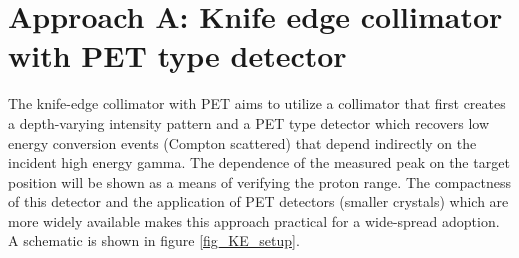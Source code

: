 \documentclass[11pt,a4paper]{article}
\begin{document}
\section{Approach A: Knife edge collimator with PET type  detector}
\label{section_KE}



The knife-edge collimator with PET aims to utilize a collimator that first creates a depth-varying intensity pattern and a PET type detector which recovers low energy conversion events (Compton scattered) that depend indirectly on the incident high energy gamma. The dependence of the measured peak on the target position will be shown as a means of verifying the proton range. The compactness of this detector and the application of PET detectors (smaller crystals) which are more widely available makes this approach practical for a wide-spread adoption. A schematic is shown in figure \ref{fig_KE_setup}. 

\end{document}
